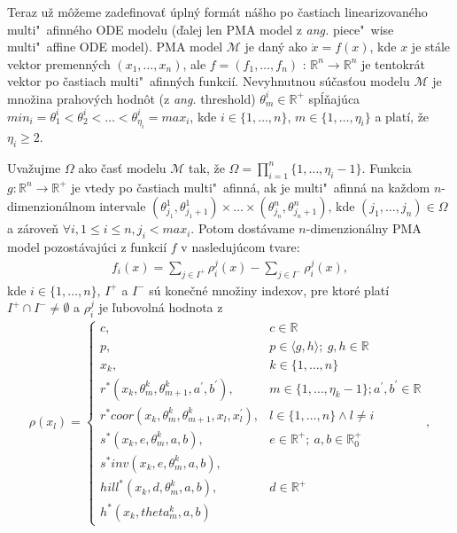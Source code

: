 \documentclass[11pt,final,oneside]{fithesis}
\begin{document}
Teraz u\v z m\^ o\v zeme zadefinova\v t \'upln\'y form\'at n\'a\v sho po \v castiach linearizovan\'eho multi"~a\-fin\-n\'eho ODE modelu 
(\v dalej len PMA model z \textit{ang.} piece"~wise multi"~affine ODE model). PMA model $\mathcal{M}$ je dan\'y ako $\dot{x} = f(x)$, 
kde $x$ je st\'ale vektor premenn\'ych $(x_1,\dots{},x_n)$, ale $f = (f_1,\dots{},f_n)$ : $\mathbb{R}^n \rightarrow \mathbb{R}^n$ je tentokr\'at vektor 
po \v castiach multi"~afinn\'ych funkci\'i. Nevyhnutnou s\'u\v cas\v tou modelu $\mathcal{M}$ je mno\v zina prahov\'ych hodn\^ ot (z \textit{ang.} threshold)
$\theta_m^i \in \mathbb{R}^+$ sp\'l\v naj\'uca $min_i = \theta_1^i < \theta_2^i < \dots{} < \theta_{\eta_i}^i = max_i$, kde $i \in \{1,\dots{},n\}$, 
$m \in \{1,\dots{},\eta_i\}$ a plat\'i, \v ze $\eta_i \geq 2$.

Uva\v zujme $\Omega$ ako \v cas\v t modelu $\mathcal{M}$ tak, \v ze $\Omega = \prod_{i = 1}^n\{1,\dots{},\eta_i - 1\}$. Funkcia 
$g : \mathbb{R}^n \rightarrow \mathbb{R}^+$ je vtedy po \v castiach multi"~afinn\'a, ak je multi"~afinn\'a na ka\v zdom $n$-dimenzion\'alnom intervale
$(\theta_{j_1}^1,\theta_{j_1 + 1}^1)\times \dots{} \times (\theta_{j_n}^n,\theta_{j_n + 1}^n)$, kde $(j_1,\dots{},j_n) \in \Omega$ a z\'arove\v n 
$\forall{}i, 1 \leq i \leq n, j_i < max_i$. Potom dost\'avame $n$-dimenzion\'alny PMA model pozost\'avaj\'uci z funkci\'i $f$ v nasleduj\'ucom tvare:
\begin{align*}
f_i(x) = \underset{j \in I^+}\sum{\rho_i^j(x)} - \underset{j \in I^-}\sum{\rho_i^j(x)},
\end{align*}
kde $i \in \{1,\dots{},n\}$, $I^+$ a $I^-$ s\'u kone\v cn\'e mno\v ziny indexov, pre ktor\'e plat\'i\ $I^+ \cap I^- \neq \emptyset$ a $\rho_i^j$ je 
\v lubovoln\'a hodnota z 
\begin{align*}
\rho(x_l) = 
\left\{ \begin{array}{cl}
c, &c \in \mathbb{R}\\
p, &p \in \langle g,h \rangle; \ g,h \in \mathbb{R}\\
x_k, & k \in \{1,\dots{},n\}\\
r^*(x_k,\theta_m^k,\theta_{m+1}^k,a^{'},b^{'}), &m \in \{1,\dots{},\eta_k-1\}; a^{'},b^{'} \in \mathbb{R}\\
r^*coor(x_k,\theta_m^k,\theta_{m+1}^k,x_l,x_l^{'}), &l \in \{1,\dots{},n\} \wedge l \neq i\\
s^*(x_k,e,\theta_m^k,a,b), &e \in \mathbb{R}^+; \ a,b \in \mathbb{R}_0^+\\
s^*inv(x_k,e,\theta_m^k,a,b),\\
hill^*(x_k,d,\theta_m^k,a,b), &d \in \mathbb{R}^+\\
h^*(x_k,theta_m^k,a,b)
\end{array} \right. ,
\end{align*}
\end{document}
